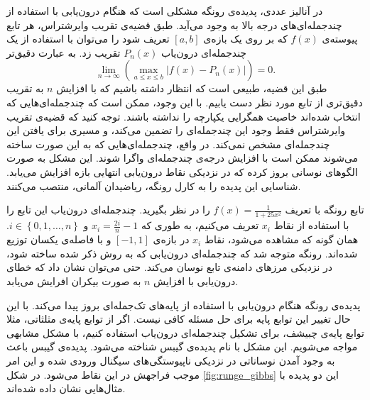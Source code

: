 \documentclass[12pt,onecolumn,a4paper]{article}
\begin{document}
در آنالیز عددی، پدیده‌ی رونگه مشکلی است که هنگام درون‌یابی با استفاده از چندجمله‌ای‌های درجه بالا به وجود می‌آید. طبق قضیه‌ی تقریب وایرشتراس،
هر تابع پیوسته‌ی 
$f(x)$
که بر روی یک بازه‌ی
$[a,b]$
تعریف شود را می‌توان با استفاده از یک چندجمله‌ای درون‌یاب
$P_n(x)$
تقریب زد. به عبارت دقیق‌تر
\begin{equation*}
    \lim_{n\rightarrow \infty}\left(\max _{{a\leq x\leq b}}\left|f(x)-P_{n}(x)\right|\right)=0.
\end{equation*}
طبق این قضیه، طبیعی است که انتظار داشته باشیم که با افزایش 
$n$
به تقریب دقیق‌تری از تابع مورد نظر دست یابیم. با این وجود، ممکن است که چندجمله‌ای‌هایی که انتخاب شده‌اند خاصیت همگرایی یکپارچه را نداشته باشند. توجه کنید که قضیه‌ی تقریب وایرشتراس فقط وجود این چندجمله‌ای را تضمین می‌کند، و مسیری برای یافتن این چندجمله‌ای مشخص نمی‌کند. در واقع، چندجمله‌ای‌هایی که به این صورت ساخته می‌شوند ممکن است با افزایش درجه‌ی چندجمله‌ای واگرا شوند. این مشکل به صورت الگوهای نوسانی بروز کرده که در نزدیکی نقاط درون‌یابی انتهایی بازه افزایش می‌یابد. شناسایی این پدیده را به  کارل رونگه،
ریاضیدان آلمانی، منتصب می‌کنند.

تابع رونگه با تعریف 
$f(x)=\frac{1}{1+25x^2}$ 
را در نظر بگیرید. چندجمله‌ای درون‌یاب این تابع را با استفاده از نقاط 
$x_i$ 
تعریف می‌کنیم، به طوری که
$x_{i}=\frac{2i}{n}-1$ 
و 
$i\in \left\{0,1,\dots ,n\right\}$.
همان گونه که مشاهده می‌شود، نقاط 
$x_i$ 
در بازه‌ی 
$[-1,1]$ 
و با فاصله‌ی یکسان توزیع شده‌اند. رونگه متوجه شد که چندجمله‌ای درون‌یابی که به روش ذکر شده ساخته شود، در نزدیکی مرز‌های دامنه‌ی تابع نوسان می‌کند. حتی می‌توان نشان داد که خطای درون‌یابی با افزایش 
$n$ 
 به صورت بیکران افرایش می‌یابد.

پدیده‌ی رونگه هنگام درون‌یابی با استفاده از پایه‌های تک‌جمله‌ای 
بروز پیدا می‌کند. با این حال تغییر این توابع پایه برای حل مسئله کافی نیست. اگر از توابع پایه‌ی مثلثاتی، مثلا توابع پایه‌ی چبیشف، برای تشکیل چندجمله‌ای درون‌یاب استفاده کنیم، با مشکل مشابهی مواجه می‌شویم. این مشکل  با نام پدیده‌ی گیبس
شناخته می‌شود. پدیده‌ی گیبس باعث به وجود آمدن نوساناتی در نزدیکی ناپیوستگی‌های سیگنال ورودی شده و این امر موجب فراجهش
در این نقاط می‌شود. در شکل 
\ref{fig:runge_gibbs} 
این دو پدیده با مثال‌هایی نشان داده‌ شده‌اند.
\end{document}
